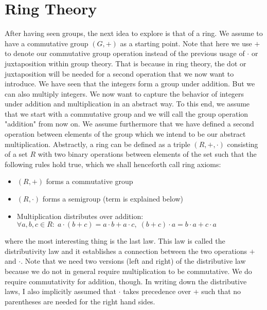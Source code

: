 \section{Ring Theory}
After having seen groups, the next idea to explore is that of a ring. We assume to have a commutative group $(G, +)$ as a starting point. Note that here we use $+$ to denote our commutative group operation instead of the previous usage of $\cdot$ or juxtaposition within group theory. That is because in ring theory, the dot or juxtaposition will be needed for a second operation that we now want to introduce. We have seen that the integers form a group under addition. But we can also multiply integers. We now want to capture the behavior of integers under addition and multiplication in an abstract way. To this end, we assume that we start with a commutative group and we will call the group operation "addition" from now on. We assume furthermore that we have defined a second operation between elements of the group which we intend to be our abstract multiplication. Abstractly, a ring can be defined as a triple $(R,+,\cdot)$ consisting of a set $R$ with two binary operations between elements of the set such that the following rules hold true, which we shall henceforth call ring axioms:
\begin{itemize}
\item $(R,+)$ forms a commutative group
\item $(R,\cdot)$ forms a semigroup (term is explained below)
\item Multiplication distributes over addition: 
$\forall a,b,c \in R: \;  
a \cdot (b + c) = a \cdot b + a \cdot c, \; 
(b + c) \cdot a = b \cdot a + c \cdot a$
\end{itemize}
where the most interesting thing is the last law. This law is called the distributivity law and it establishes a connection between the two operations $+$ and $\cdot$. Note that we need two versions (left and right) of the distributive law because we do not in general require multiplication to be commutative. We do require commutativity for addition, though. In writing down the distributive laws, I also implicitly assumed that $\cdot$ takes precedence over $+$ such that no parentheses are needed for the right hand sides.

